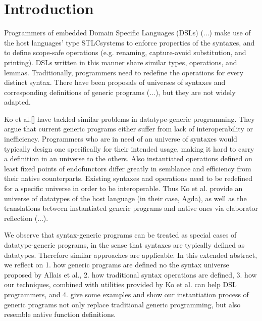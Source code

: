 \documentclass[sigplan,review,fleqn]{acmart}
\begin{document}
\maketitle


\section{Introduction}
\label{sec:introduction}
Programmers of embedded Domain Specific Languages (DSLs) (...) make use of the host languages' type STLCsystems to enforce properties of the syntaxes, and to define scope-safe operations (e.g. renaming, capture-avoid substitution, and printing).
DSLs written in this manner share similar types, operations, and lemmas.
Traditionally, programmers need to redefine the operations for every distinct syntax.
There have been proposals of universes of syntaxes and corresponding definitions of generic programs (...), but they are not widely adapted.

Ko et al.[] have tackled similar problems in datatype-generic programming.
They argue that current generic programs either suffer from lack of interoperability or inefficiency.
Programmers who are in need of an universe of syntaxes would typically design one specifically for their intended usage, making it hard to carry a definition in an universe to the others.
Also instantiated operations defined on least fixed points of endofunctors differ greatly in semblance and efficiency from their native counterparts.
Existing syntaxes and operations need to be redefined for a specific universe in order to be interoperable.
Thus Ko et al. provide an universe of datatypes of the host language (in their case, Agda), as well as the translations between instantiated generic programs and native ones via elaborator reflection (...).

We observe that syntax-generic programs can be treated as special cases of datatype-generic programs, in the sense that syntaxes are typically defined as datatypes.
Therefore similar approaches are applicable.
In this extended abstract, we reflect on
1. how generic programs are defined no the syntax universe proposed by Allais et al.,
2. how traditional syntax operations are defined,
3. how our techniques, combined with utilities provided by Ko et al. can help DSL programmers, and
4. give some examples and show our instantiation process of generic programs not only replace traditional generic programming, but also resemble native function definitions.
\end{document}
